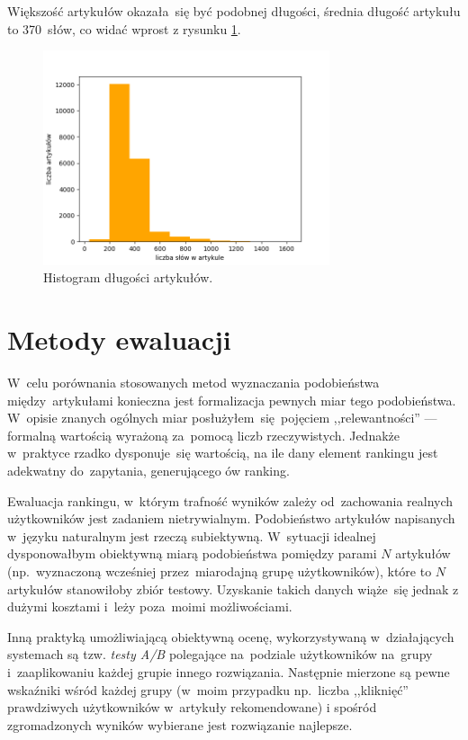 \documentclass[pl]{minipw} %
\begin{document}
Większość artykułów okazała~się być podobnej długości, średnia długość artykułu to 370~słów, co widać wprost z rysunku	\ref{fig:lenghts}.

\begin{figure}[H]
	\centering
	\includegraphics[width=0.75\textwidth]{img/articles_length_hist.png}
	\caption{Histogram długości artykułów.}
	\label{fig:lenghts}
\end{figure}

\chapter{Metody ewaluacji}

W~celu porównania stosowanych metod wyznaczania podobieństwa między~artykułami konieczna jest formalizacja pewnych miar tego podobieństwa. W~opisie znanych ogólnych miar posłużyłem~się pojęciem ,,relewantności'' --- formalną wartością wyrażoną za~pomocą liczb rzeczywistych. Jednakże w~praktyce rzadko dysponuje~się wartością, na ile dany element rankingu jest adekwatny do~zapytania, generującego ów ranking.  

Ewaluacja rankingu, w~którym trafność wyników zależy od~zachowania realnych użytkowników jest zadaniem nietrywialnym. Podobieństwo artykułów napisanych w~języku naturalnym jest rzeczą subiektywną. W~sytuacji idealnej dysponowałbym obiektywną miarą podobieństwa pomiędzy parami $N$ artykułów (np.~wyznaczoną wcześniej przez~miarodajną grupę użytkowników), które to $N$ artykułów stanowiłoby zbiór testowy. Uzyskanie takich danych wiąże~się jednak z dużymi kosztami i~leży poza~moimi możliwościami.

Inną praktyką umożliwiającą obiektywną ocenę, wykorzystywaną w~działających systemach są tzw. \textit{testy A/B} polegające na~podziale użytkowników na~grupy i~zaaplikowaniu każdej grupie innego rozwiązania. Następnie mierzone są pewne wskaźniki wśród każdej grupy (w~moim przypadku np.~liczba ,,kliknięć'' prawdziwych użytkowników w~artykuły rekomendowane) i spośród zgromadzonych wyników wybierane jest rozwiązanie najlepsze.
\end{document}
